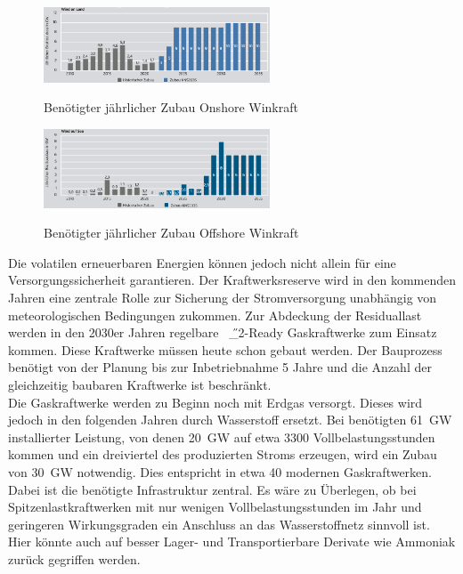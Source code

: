 				\begin{figure}[H]
				\centering
				\includegraphics[page=1, clip, width=0.6\textwidth]{./anhang/Zubau Onshore Agora2035.png}
				\caption{Benötigter jährlicher Zubau Onshore Winkraft}
				\label{Abb.Zubau Onshore Agora2035} \cite[S.24]{Agora_KlimaneutralesStromsystem}
			\end{figure}
		
				\begin{figure}[H]
				\centering
				\includegraphics[page=1, clip, width=0.6\textwidth]{./anhang/Zubau Offshore Agora2035.png}
				\caption{Benötigter jährlicher Zubau Offshore Winkraft}
				\label{Abb.Zubau Offshore Agora2035} \cite[S.24]{Agora_KlimaneutralesStromsystem}
			\end{figure}
		Die volatilen erneuerbaren Energien können jedoch nicht allein für eine Versorgungssicherheit garantieren. Der Kraftwerksreserve wird in den kommenden Jahren eine zentrale Rolle zur Sicherung der Stromversorgung unabhängig von meteorologischen Bedingungen zukommen. Zur Abdeckung der Residuallast werden in den 2030er Jahren regelbare \SI{}{\H{_2}}-Ready Gaskraftwerke zum Einsatz kommen. Diese Kraftwerke müssen heute schon gebaut werden. Der Bauprozess benötigt von der Planung bis zur Inbetriebnahme 5 Jahre und die Anzahl der gleichzeitig baubaren Kraftwerke ist beschränkt.\\
		Die Gaskraftwerke werden zu Beginn noch mit Erdgas versorgt. Dieses wird jedoch in den folgenden Jahren durch Wasserstoff ersetzt. Bei benötigten \SI{61}{\giga \watt} installierter Leistung, von denen \SI{20}{\giga \watt} auf etwa 3300 Vollbelastungsstunden kommen und ein dreiviertel des produzierten Stroms erzeugen, wird ein Zubau von \SI{30}{\giga \watt} notwendig. \cite[S.9]{Agora_KlimaneutralesStromsystem} Dies entspricht in etwa 40 modernen Gaskraftwerken. Dabei ist die benötigte Infrastruktur zentral. Es wäre zu Überlegen, ob bei Spitzenlastkraftwerken mit nur wenigen Vollbelastungsstunden im Jahr und geringeren Wirkungsgraden ein Anschluss an das Wasserstoffnetz sinnvoll ist. Hier könnte auch auf besser Lager- und Transportierbare Derivate wie Ammoniak zurück gegriffen werden.\\
		
